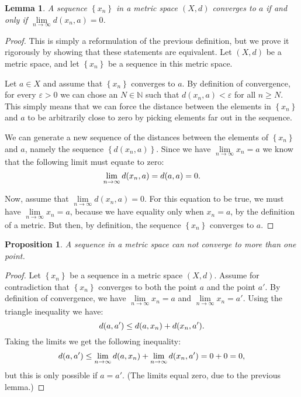 \documentclass[a4paper]{report}
\newtheorem{prp}{Proposition}
\newtheorem{lma}{Lemma}
\theoremstyle{definition}
\begin{document}
\begin{lma}
  A sequence $\left\{ x_{n}\right\}$ in a metric space $(X, d)$ converges to
  $a$ if and only if $\lim\limits_{n\rightarrow\infty} d(x_{n}, a) = 0$.
\end{lma}
\begin{proof}
  This is simply a reformulation of the previous definition, but we prove it
  rigorously by showing that these statements are equivalent.
  Let $(X, d)$ be a metric space, and let $\left\{ x_n \right\}$ be a sequence
  in this metric space.  
  
  Let $a \in X$ and assume that $\left\{ x_n \right\}$ converges to $a$. By
  definition of convergence, for every $\varepsilon > 0$ we can chose an $N \in
  \mathbb{N}$ such that $d(x_{n}, a) < \varepsilon$ for all $n \geq N$.  This
  simply means that we can force the distance between the elements in $\left\{
  x_{n} \right\}$ and $a$ to be arbitrarily close to zero by picking elements
  far out in the sequence. 
  
  We can generate a new sequence of the distances
  between the elements of $\left\{ x_n \right\}$ and $a$, namely the sequence
  $\left\{d(x_n, a)\right\}$.  Since we have $\lim\limits_{n\rightarrow\infty} x_n
  = a$ we know that the following limit must equate to zero:
  \begin{equation}
    \notag
    \lim\limits_{n\rightarrow\infty}d(x_n, a) = d(a, a) = 0.
  \end{equation}

  Now, assume that $\lim\limits_{n\rightarrow\infty} d(x_{n}, a) = 0$.  For
  this equation to be true, we must have $\lim\limits_{n\rightarrow\infty}x_n =
  a$, because we have equality only when $x_n = a$, by the definition of a
  metric.  But then, by definition, the sequence $\left\{ x_n \right\}$
  converges to $a$.
\end{proof}

\begin{prp}
  A sequence in a metric space can not converge to more than one point. 
\end{prp}

\begin{proof}
  Let $\left\{ x_n \right\}$ be a sequence in a metric space $(X, d)$. Assume
  for contradiction that $\left\{ x_{n} \right\}$ converges to both the point
  $a$ and the point $a'$.  By definition of convergence, we have
  $\lim\limits_{n\rightarrow\infty} x_n = a$ and
  $\lim\limits_{n\rightarrow\infty} x_n = a'$.
  Using the triangle inequality we have:
  \begin{equation}
    \notag
    d(a, a') \leq d(a, x_n) + d(x_n, a').
  \end{equation}
  Taking the limits we get the following inequality:
  \begin{equation}
    \notag
    d(a, a') \leq \lim\limits_{n\rightarrow\infty} d(a, x_n) + \lim\limits_{n\rightarrow\infty} d(x_n, a') = 0 + 0 = 0, 
  \end{equation}
  but this is only possible if $a = a'$. (The limits equal zero, due to the previous lemma.)
\end{proof}
\end{document}
